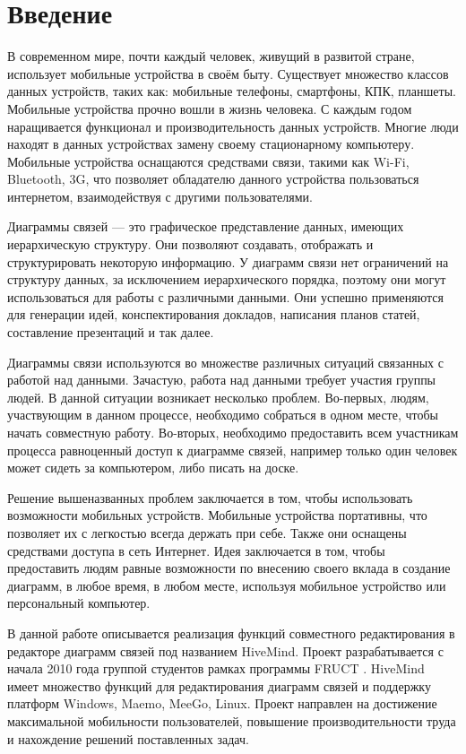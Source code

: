 \newpage

\chapter*{Введение}
\label{chap:introduction}

В современном мире, почти каждый человек, живущий в развитой стране, использует
мобильные устройства в своём быту. Существует множество классов данных
устройств, таких как: мобильные телефоны, смартфоны, КПК, планшеты. Мобильные
устройства прочно вошли в жизнь человека. С каждым годом наращивается функционал
и производительность данных устройств. Многие люди находят в данных устройствах
замену своему стационарному компьютеру. Мобильные устройства оснащаются
средствами связи, такими как Wi-Fi, Bluetooth, 3G, что позволяет обладателю
данного устройства пользоваться интернетом, взаимодействуя с другими
пользователями.

Диаграммы связей --- это графическое представление данных, имеющих иерархическую
структуру. Они позволяют создавать, отображать и структурировать некоторую
информацию. У диаграмм связи нет ограничений на структуру данных, за исключением
иерархического порядка, поэтому они могут использоваться для работы с различными
данными. Они успешно применяются для генерации идей, конспектирования докладов,
написания планов статей, составление презентаций и так далее.

Диаграммы связи используются во множестве различных ситуаций связанных с работой
над данными. Зачастую, работа над данными требует участия группы людей. В данной
ситуации возникает несколько проблем. Во-первых, людям, участвующим в данном
процессе, необходимо собраться в одном месте, чтобы начать совместную работу.
Во-вторых, необходимо предоставить всем участникам процесса равноценный доступ к
диаграмме связей, например только один человек может сидеть за компьютером, либо
писать на доске.

Решение вышеназванных проблем заключается в том, чтобы использовать возможности
мобильных устройств. Мобильные устройства портативны, что позволяет их с
легкостью всегда держать при себе. Также они оснащены средствами доступа в сеть
Интернет. Идея заключается в том, чтобы предоставить людям равные возможности по
внесению своего вклада в создание диаграмм, в любое время, в любом месте,
используя мобильное устройство или персональный компьютер.

В данной работе описывается реализация функций совместного редактирования в
редакторе диаграмм связей под названием HiveMind. Проект разрабатывается с
начала 2010 года группой студентов рамках программы FRUCT
\cite{hivemind-8th-fruct}. HiveMind имеет множество функций для редактирования
диаграмм связей и поддержку платформ Windows, Maemo, MeeGo, Linux. Проект
направлен на достижение максимальной мобильности пользователей, повышение
производительности труда и нахождение решений поставленных задач.
